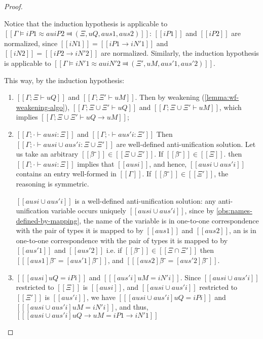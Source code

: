 \begin{proof}
\begin{caseof}
                Notice that the induction hypothesis is applicable to 
                $[[Γ ⊨ iP1 ≈au iP2 ⫤ (Ξ, uQ, aus1, aus2)]]$:
                $[[iP1]]$ and $[[iP2]]$ are normalized, since $[[iN1]] = [[iP1 → iN'1]]$
                and $[[iN2]] = [[iP2 → iN'2]]$ are normalized.
                Similarly, the induction hypothesis is applicable to
                $[[Γ ⊨ iN'1 ≈au iN'2 ⫤ (Ξ', uM, aus'1, aus'2)]]$.

                This way, by the induction hypothesis:
                \begin{enumerate}
                    \item $[[Γ ; Ξ ⊢ uQ]]$ and $[[Γ ; Ξ' ⊢ uM]]$. 
                    Then by weakening (\cref{lemma:wf-weakening-algo}), 
                    $[[Γ ; Ξ ∪ Ξ' ⊢ uQ]]$ and 
                    $[[Γ ; Ξ ∪ Ξ' ⊢ uM]]$, which implies $[[Γ ; Ξ ∪ Ξ' ⊢ uQ → uM]]$;

                    \item $[[Γ ; · ⊢ ausi : Ξ]]$ and $[[Γ ; · ⊢ aus'i : Ξ']]$
                        Then $[[Γ ; · ⊢ ausi ∪ aus'i : Ξ ∪ Ξ']]$
                        are well-defined anti-unification solution.
                        Let us take an arbitrary $[[β̂⁻]] \in [[Ξ ∪ Ξ']]$.
                        If $[[β̂⁻]] \in [[Ξ]]$.
                        then $[[Γ ; · ⊢ ausi : Ξ]]$ implies that $[[ausi]]$, and hence,
                        $[[ausi ∪ aus'i]]$ contains an entry well-formed in $[[Γ]]$.
                        If $[[β̂⁻]] \in [[Ξ']]$, the reasoning is symmetric.

                        $[[ausi ∪ aus'i]]$ is a well-defined anti-unification solution:
                        any anti-unification variable occurs 
                        uniquely $[[ausi ∪ aus'i]]$, since by \cref{obs:names-defined-by-mapping},
                        the name of the variable is in one-to-one correspondence with 
                        the pair of types it is mapped to
                        by $[[aus1]]$ and $[[aus2]]$, 
                        an is in one-to-one correspondence with the pair of types it is mapped to
                        by $[[aus'1]]$ and $[[aus'2]]$ 
                        i.e.  if $[[β̂⁻]] \in [[Ξ ∩ Ξ']]$ then $[[ [aus1]β̂⁻ = [aus'1]β̂⁻ ]]$,
                        and $[[ [aus2]β̂⁻ = [aus'2]β̂⁻ ]]$.

                    \item $[[ [ausi] uQ = iPi ]]$ and $[[ [aus'i] uM = iN'i ]]$.
                    Since $[[ausi ∪ aus'i]]$ restricted to $[[Ξ]]$ is $[[ausi]]$,
                    and $[[ausi ∪ aus'i]]$ restricted to $[[Ξ']]$ is $[[aus'i]]$,
                    we have $[[ [ausi ∪ aus'i] uQ = iPi ]]$ and 
                    $[[ [ausi ∪ aus'i] uM = iN'i ]]$, and thus, 
                    $[[ [ausi ∪ aus'i] uQ → uM = iP1 → iN'1 ]]$
                \end{enumerate}


\end{caseof}
\end{proof}
